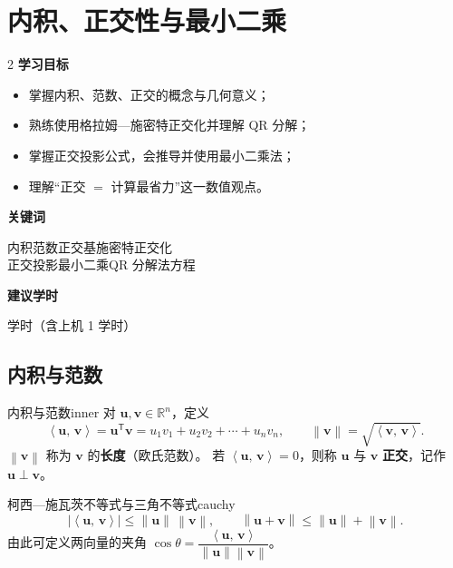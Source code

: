 \documentclass[11pt,a4paper,openany]{ctexbook}
\newcommand{\norm}[1]{\left\lVert #1 \right\rVert}
\newcommand{\abs}[1]{\left\lvert #1 \right\rvert}
\newcommand{\ip}[2]{\left\langle #1,\,#2 \right\rangle}
\newcommand{\Rnum}[1]{\mathbb{R}^{#1}}
\begin{document}
\chapter{内积、正交性与最小二乘}
\label{ch:ortho}

\begin{chapoutline}
\small
\begin{multicols}{2}
\textbf{学习目标}
\begin{itemize}[leftmargin=1.5em, itemsep=1.5pt]
\item 掌握内积、范数、正交的概念与几何意义；
\item 熟练使用格拉姆—施密特正交化并理解 QR 分解；
\item 掌握正交投影公式，会推导并使用最小二乘法；
\item 理解“正交 $=$ 计算最省力”这一数值观点。
\end{itemize}
\columnbreak
\textbf{关键词}
\par\smallskip
内积\quad 范数\quad 正交基\quad 施密特正交化\\
正交投影\quad 最小二乘\quad QR 分解\quad 法方程
\par\smallskip
\textbf{建议学时}
\par{} 学时（含上机 1 学时）
\end{multicols}
\end{chapoutline}

\section{内积与范数}

\begin{defn}{内积与范数}{inner}
对 $\boldsymbol{u},\boldsymbol{v}\in\Rnum{n}$，定义
\[
\ip{\boldsymbol{u}}{\boldsymbol{v}}
=\boldsymbol{u}^{\mathsf T}\boldsymbol{v}
=u_1v_1+u_2v_2+\cdots+u_nv_n,
\qquad
\norm{\boldsymbol{v}}=\sqrt{\ip{\boldsymbol{v}}{\boldsymbol{v}}}.
\]
$\norm{\boldsymbol{v}}$ 称为 $\boldsymbol{v}$ 的\textbf{长度}（欧氏范数）。
若 $\ip{\boldsymbol{u}}{\boldsymbol{v}}=0$，则称 $\boldsymbol{u}$ 与 $\boldsymbol{v}$
\textbf{正交}，记作 $\boldsymbol{u}\perp\boldsymbol{v}$。
\end{defn}

\begin{prop}{柯西—施瓦茨不等式与三角不等式}{cauchy}
\[
\abs{\ip{\boldsymbol{u}}{\boldsymbol{v}}}\le\norm{\boldsymbol{u}}\,\norm{\boldsymbol{v}},
\qquad
\norm{\boldsymbol{u}+\boldsymbol{v}}\le\norm{\boldsymbol{u}}+\norm{\boldsymbol{v}}.
\]
由此可定义两向量的夹角
$\cos\theta=\dfrac{\ip{\boldsymbol{u}}{\boldsymbol{v}}}{\norm{\boldsymbol{u}}\norm{\boldsymbol{v}}}$。
\end{prop}
\end{document}
